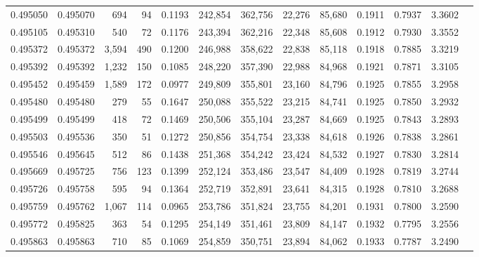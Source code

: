 \begin{tabular}{rrrrrrrrrrrrr}
0.495050 & 0.495070 &   694 &    94 &                                     0.1193 & 242,854 & 362,756 &  22,276 &  85,680 & 0.1911 & 0.7937 & 3.3602 \\
0.495105 & 0.495310 &   540 &    72 &                                     0.1176 & 243,394 & 362,216 &  22,348 &  85,608 & 0.1912 & 0.7930 & 3.3552 \\
0.495372 & 0.495372 & 3,594 &   490 &                                     0.1200 & 246,988 & 358,622 &  22,838 &  85,118 & 0.1918 & 0.7885 & 3.3219 \\
0.495392 & 0.495392 & 1,232 &   150 &                                     0.1085 & 248,220 & 357,390 &  22,988 &  84,968 & 0.1921 & 0.7871 & 3.3105 \\
0.495452 & 0.495459 & 1,589 &   172 &                                     0.0977 & 249,809 & 355,801 &  23,160 &  84,796 & 0.1925 & 0.7855 & 3.2958 \\
0.495480 & 0.495480 &   279 &    55 &                                     0.1647 & 250,088 & 355,522 &  23,215 &  84,741 & 0.1925 & 0.7850 & 3.2932 \\
0.495499 & 0.495499 &   418 &    72 &                                     0.1469 & 250,506 & 355,104 &  23,287 &  84,669 & 0.1925 & 0.7843 & 3.2893 \\
0.495503 & 0.495536 &   350 &    51 &                                     0.1272 & 250,856 & 354,754 &  23,338 &  84,618 & 0.1926 & 0.7838 & 3.2861 \\
0.495546 & 0.495645 &   512 &    86 &                                     0.1438 & 251,368 & 354,242 &  23,424 &  84,532 & 0.1927 & 0.7830 & 3.2814 \\
0.495669 & 0.495725 &   756 &   123 &                                     0.1399 & 252,124 & 353,486 &  23,547 &  84,409 & 0.1928 & 0.7819 & 3.2744 \\
0.495726 & 0.495758 &   595 &    94 &                                     0.1364 & 252,719 & 352,891 &  23,641 &  84,315 & 0.1928 & 0.7810 & 3.2688 \\
0.495759 & 0.495762 & 1,067 &   114 &                                     0.0965 & 253,786 & 351,824 &  23,755 &  84,201 & 0.1931 & 0.7800 & 3.2590 \\
0.495772 & 0.495825 &   363 &    54 &                                     0.1295 & 254,149 & 351,461 &  23,809 &  84,147 & 0.1932 & 0.7795 & 3.2556 \\
0.495863 & 0.495863 &   710 &    85 &                                     0.1069 & 254,859 & 350,751 &  23,894 &  84,062 & 0.1933 & 0.7787 & 3.2490 \\

\end{tabular}
